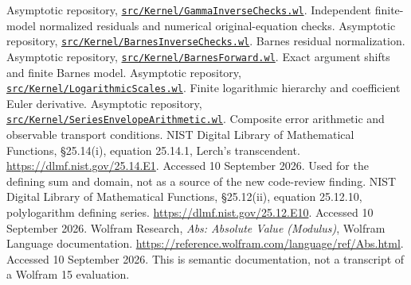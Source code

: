 \documentclass[11pt,letterpaper]{article}
\newcommand{\pinned}[2]{\href{https://github.com/VladimirReshetnikov/Asymptotic/blob/8cee870994f506b501bae3ea6bd4a3a7edb895c1/#1}{#2}}
\begin{document}
\begin{thebibliography}{99}
 Asymptotic repository, \pinned{src/Kernel/GammaInverseChecks.wl}{\nolinkurl{src/Kernel/GammaInverseChecks.wl}}. Independent finite-model normalized residuals and numerical original-equation checks.
 Asymptotic repository, \pinned{src/Kernel/BarnesInverseChecks.wl}{\nolinkurl{src/Kernel/BarnesInverseChecks.wl}}. Barnes residual normalization.
 Asymptotic repository, \pinned{src/Kernel/BarnesForward.wl}{\nolinkurl{src/Kernel/BarnesForward.wl}}. Exact argument shifts and finite Barnes model.
 Asymptotic repository, \pinned{src/Kernel/LogarithmicScales.wl}{\nolinkurl{src/Kernel/LogarithmicScales.wl}}. Finite logarithmic hierarchy and coefficient Euler derivative.
 Asymptotic repository, \pinned{src/Kernel/SeriesEnvelopeArithmetic.wl}{\nolinkurl{src/Kernel/SeriesEnvelopeArithmetic.wl}}. Composite error arithmetic and observable transport conditions.
 NIST Digital Library of Mathematical Functions, \S25.14(i), equation 25.14.1, Lerch's transcendent. \url{https://dlmf.nist.gov/25.14.E1}. Accessed 10 September 2026. Used for the defining sum and domain, not as a source of the new code-review finding.
 NIST Digital Library of Mathematical Functions, \S25.12(ii), equation 25.12.10, polylogarithm defining series. \url{https://dlmf.nist.gov/25.12.E10}. Accessed 10 September 2026.
 Wolfram Research, \emph{Abs: Absolute Value (Modulus)}, Wolfram Language documentation. \url{https://reference.wolfram.com/language/ref/Abs.html}. Accessed 10 September 2026. This is semantic documentation, not a transcript of a Wolfram 15 evaluation.
\end{thebibliography}
\end{document}
